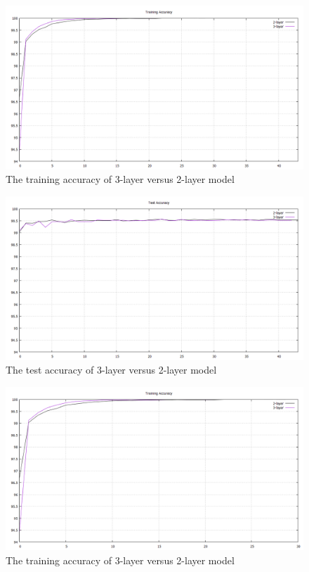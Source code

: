 \documentclass[final]{siamltexmm}
\begin{document}
{\newpage

\begin{figure}[H]
  \centering
    \includegraphics[width=1\textwidth]{../fig/training_compare.png}
  \caption{The training accuracy of 3-layer versus 2-layer model}
\end{figure}


\begin{figure}[H]
  \centering
    \includegraphics[width=1\textwidth]{../fig/test_compare.png}
  \caption{The test accuracy of 3-layer versus 2-layer model}
\end{figure}

\newpage

\begin{figure}[H]
  \centering
    \includegraphics[width=1\textwidth]{../fig/training_compare_0-30.png}
  \caption{The training accuracy of 3-layer versus 2-layer model}
\end{figure}

}
\end{document}
